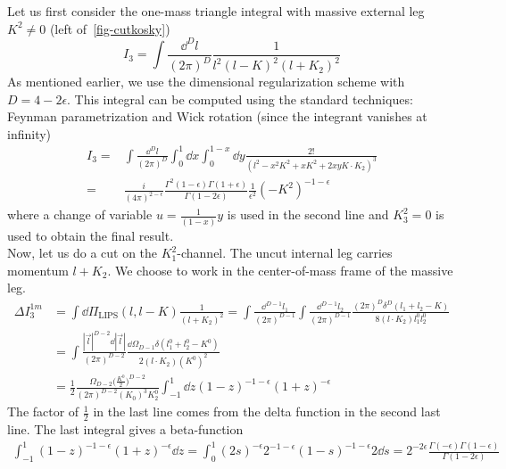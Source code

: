 Let us first consider the one-mass triangle integral with massive external leg $K^2 \neq 0$ (left of~\ref{fig-cutkosky})
\begin{equation}
I_3 = \int\frac{\dd^D l }{(2\pi)^D}\frac{1}{l^2(l-K)^2(l+K_2)^2}
\end{equation}
As mentioned earlier, we use the dimensional regularization scheme with $D = 4-2\epsilon$.
This integral can be computed using the standard techniques: Feynman parametrization and Wick rotation (since the integrant vanishes at infinity)
\begin{equation}
\begin{split}
I_3 = & \int\frac{\dd^D l }{(2\pi)^D}\int_0^{1} \dd x \int_0^{1-x}\dd y \frac{2!}{(l^2 - x^2 K^2 + xK^2 + 2xy K\cdot K_2)^3}
\\
= &
\frac{i}{(4\pi)^{2-\epsilon}}\frac{\Gamma^2(1-\epsilon)\Gamma(1+\epsilon)}{\Gamma(1-2\epsilon)}
\frac{1}{\epsilon^2}(-K^2)^{-1-\epsilon}
\end{split}
\end{equation}
where a change of variable $u =\frac{1}{(1-x)}y$ is used in the second line and $K_3^2 = 0$ is used to obtain the final result.
\\
Now, let us do a cut on the $K_1^2$-channel. 
The uncut internal leg carries momentum $l + K_2$. 
We choose to work in the center-of-mass frame of the massive leg.
%
\begin{equation}
\begin{split}
\Delta I_3^{1m} & =
\int\dd \Pi_{\textrm{LIPS}}(l, l-K) \frac{1}{(l+K_2)^2}  =
\int\frac{\dd^{D-1}l_1}{(2\pi)^{D-1}}\int\frac{\dd^{D-1}l_2}{(2\pi)^{D-1}}
\frac{(2\pi)^{D}\delta^{D}(l_1 + l_2 - K)}{8(l\cdot K_2)l_1^0 l_2^0}
\\
& = \int\frac{|\vec{l}|^{D-2}\dd |\vec{l}|}{(2\pi)^{D-2}} \frac{\dd\Omega_{D-1}\delta(l_1^0 + l_2^0 - K^0)}{2 ( l \cdot K_2)(K^0)^2}
\\
& = \frac{1}{2}\frac{\Omega_{D-2}\big(\frac{K^0}{2}\big)^{D-2}}{(2\pi)^{D-2}(K_0)^3 K^0_2} \int_{-1}^1\dd z (1-z)^{-1-\epsilon}(1+z)^{-\epsilon}
\end{split} 
\end{equation}
The factor of $\frac{1}{2}$ in the last line comes from the delta function in the second last line.
%
\iffalse
The last integral gives a beta-function
%
\begin{equation}
\begin{split}
\int^1_{-1} (1-z)^{-1-\epsilon}(1+z)^{-\epsilon} \dd z 
=\int^1_0(2s)^{-\epsilon} 2^{-1-\epsilon} (1-s)^{-1-\epsilon} 2 \dd s
=2^{-2\epsilon}\frac{\Gamma(-\epsilon)\Gamma(1-\epsilon)}{\Gamma(1-2\epsilon)}
\end{split}
\end{equation}
